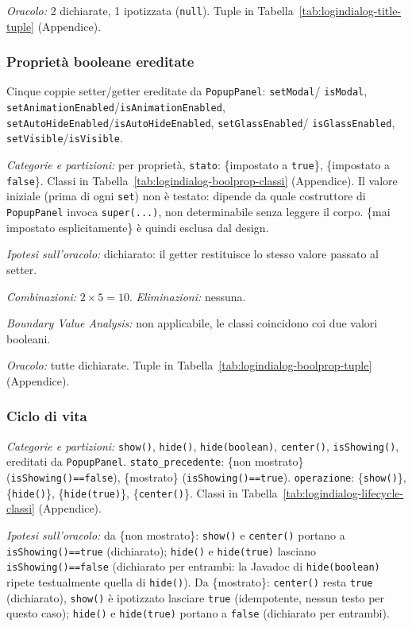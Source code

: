 \textit{Oracolo:} 2 dichiarate, 1 ipotizzata (\texttt{null}). Tuple in
Tabella~\ref{tab:logindialog-title-tuple} (Appendice).

\subsubsection{Proprietà booleane ereditate}

Cinque coppie setter/getter ereditate da \texttt{PopupPanel}: \texttt{setModal}/
\texttt{isModal}, \texttt{setAnimationEnabled}/\texttt{isAnimationEnabled},
\texttt{setAutoHideEnabled}/\texttt{isAutoHideEnabled}, \texttt{setGlassEnabled}/
\texttt{isGlassEnabled}, \texttt{setVisible}/\texttt{isVisible}.

\textit{Categorie e partizioni:} per proprietà, \texttt{stato}: \{impostato a \texttt{true}\},
\{impostato a \texttt{false}\}. Classi in Tabella~\ref{tab:logindialog-boolprop-classi}
(Appendice). Il valore iniziale (prima di ogni \texttt{set}) non è testato: dipende da quale
costruttore di \texttt{PopupPanel} invoca \texttt{super(...)}, non determinabile senza leggere
il corpo. \{mai impostato esplicitamente\} è quindi esclusa dal design.

\textit{Ipotesi sull'oracolo:} dichiarato: il getter restituisce lo stesso valore passato al
setter.

\textit{Combinazioni:} $2\times5=10$. \textit{Eliminazioni:} nessuna.

\textit{Boundary Value Analysis:} non applicabile, le classi coincidono coi due valori
booleani.

\textit{Oracolo:} tutte dichiarate. Tuple in Tabella~\ref{tab:logindialog-boolprop-tuple}
(Appendice).

\subsubsection{Ciclo di vita}

\textit{Categorie e partizioni:} \texttt{show()}, \texttt{hide()}, \texttt{hide(boolean)},
\texttt{center()}, \texttt{isShowing()}, ereditati da \texttt{PopupPanel}.
\texttt{stato\_precedente}: \{non mostrato\} (\texttt{isShowing()==false}), \{mostrato\}
(\texttt{isShowing()==true}). \texttt{operazione}: \{\texttt{show()}\}, \{\texttt{hide()}\},
\{\texttt{hide(true)}\}, \{\texttt{center()}\}. Classi in
Tabella~\ref{tab:logindialog-lifecycle-classi} (Appendice).

\textit{Ipotesi sull'oracolo:} da \{non mostrato\}: \texttt{show()} e \texttt{center()}
portano a \texttt{isShowing()==true} (dichiarato); \texttt{hide()} e \texttt{hide(true)}
lasciano \texttt{isShowing()==false} (dichiarato per entrambi: la Javadoc di
\texttt{hide(boolean)} ripete testualmente quella di \texttt{hide()}). Da \{mostrato\}:
\texttt{center()} resta \texttt{true} (dichiarato), \texttt{show()} è ipotizzato lasciare
\texttt{true} (idempotente, nessun testo per questo caso); \texttt{hide()} e \texttt{hide(true)}
portano a \texttt{false} (dichiarato per entrambi).


